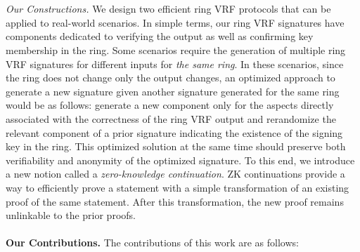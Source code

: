 \\\\
\emph{Our Constructions.}
 We design two efficient ring VRF protocols that can be applied to real-world scenarios.
In simple terms,  our ring VRF signatures have components dedicated to verifying the output as well as confirming key membership in the ring. Some scenarios require the generation of multiple ring VRF signatures for different inputs for \emph{the same ring}. In these scenarios,  since the ring does not change only the output changes, an optimized approach to generate a new signature given another signature generated for the same ring would be as follows:  generate a new component only for the aspects directly associated with the correctness of the ring VRF output and  rerandomize the relevant component of a prior signature indicating the existence of the signing key in the ring. This optimized solution at the same time should preserve both verifiability and anonymity of the optimized signature.
To this end, we introduce a  new notion called  a \emph{zero-knowledge continuation}. ZK continuations provide a way to efficiently prove a statement with a simple transformation of an existing proof of the same statement. After this transformation, the new proof remains unlinkable to the prior proofs. 
\\\\
\noindent \textbf{Our Contributions.}  The contributions of this work are as follows:
